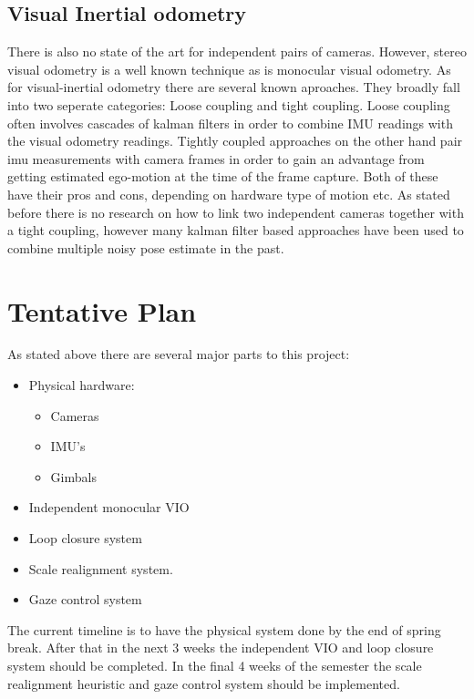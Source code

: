 \documentclass{article}
\begin{document}
\subsection{Visual Inertial odometry}
There is also no state of the art for independent pairs of cameras. However, stereo visual odometry is a well
known technique as is monocular visual odometry. As for visual-inertial odometry there are several known aproaches.
They broadly fall into two seperate categories: Loose coupling and tight coupling. Loose coupling often involves
cascades of kalman filters in order to combine IMU readings with the visual odometry readings. Tightly coupled
approaches on the other hand pair imu measurements with camera frames in order to gain an advantage from getting
estimated ego-motion at the time of the frame capture. Both of these have their pros and cons, depending on hardware
type of motion etc. As stated before there is no research on how to link two independent cameras together with
a tight coupling, however many kalman filter based approaches have been used to combine multiple noisy pose
estimate in the past. 

\section{Tentative Plan}
As stated above there are several major parts to this project:

\begin{itemize}
\item Physical hardware:
  \begin{itemize}
  \item Cameras
  \item IMU's
  \item Gimbals
  \end{itemize}
\item Independent monocular VIO
\item Loop closure system
\item Scale realignment system.
\item Gaze control system
\end{itemize}

The current timeline is to have the physical system done by the end of spring break. After that in the next 3
weeks the independent VIO and loop closure system should be completed. In the final 4 weeks of the semester the
scale realignment heuristic and gaze control system should be implemented.
\end{document}
